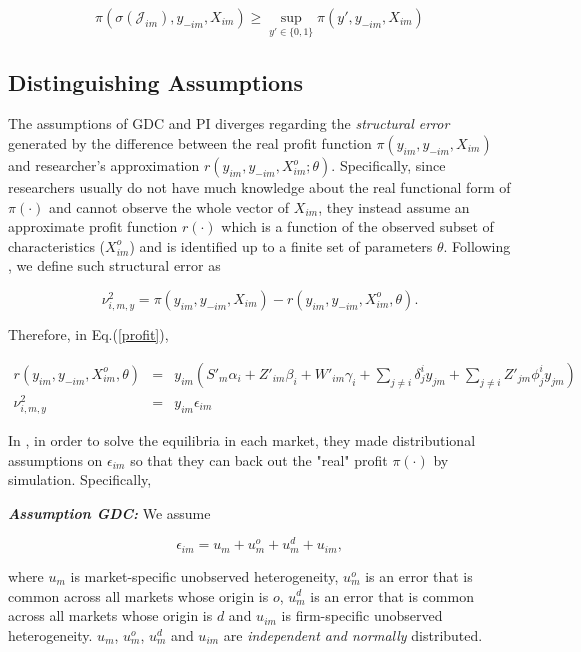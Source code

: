 \documentclass[a4paper]{article}
\begin{document}
\begin{equation}
\pi(\sigma(\mathcal{J}_{im}),y_{-im},X_{im}) \geq \sup_{y'\in \{0,1\}} \pi(y',y_{-im},X_{im})
\label{ie3}
\end{equation}

\subsection{Distinguishing Assumptions}

The assumptions of GDC and PI diverges regarding the \textit{structural error} generated by the difference between the real profit function $\pi(y_{im},y_{-im},X_{im})$ and researcher's approximation $r(y_{im},y_{-im},X^o_{im}; \theta)$. Specifically, since researchers usually do not have much knowledge about the real functional form of $\pi(\cdot)$ and cannot observe the whole vector of $X_{im}$, they instead assume an approximate profit function $r(\cdot)$ which is a function of the observed subset of characteristics ($X^o_{im}$) and is identified up to a finite set of parameters $\theta$. Following \cite{pakes2015moment}, we define such structural error as

\begin{equation}
\nu^2_{i,m,y}=\pi(y_{im},y_{-im},X_{im})-r(y_{im},y_{-im},X^o_{im},\theta).
\end{equation}

Therefore, in Eq.(\ref{profit}),

\begin{eqnarray}
r(y_{im},y_{-im},X^o_{im},\theta)&=&y_{im}(S'_m\alpha_i+Z'_{im}\beta_i+W'_{im}\gamma_i+\sum_{j\neq i}\delta_{j}^i y_{jm}+\sum_{j\neq i}Z'_{jm}\phi_j^iy_{jm})\\
\nu^2_{i,m,y}&=&y_{im}\epsilon_{im}
\end{eqnarray}


In \cite{ciliberto2009market}, in order to solve the equilibria in each market, they made distributional assumptions on $\epsilon_{im}$ so that they can back out the "real" profit $\pi(\cdot)$ by simulation. Specifically,

\bigskip
\textbf{\textit{Assumption GDC:}} We assume

$$\epsilon_{im}=u_{m}+u^o_{m}+u^d_{m}+u_{im},$$

where $u_m$ is market-specific unobserved heterogeneity, $u^o_m$ is an error that is common across all markets whose origin is $o$, $u^d_m$ is an error that is common across all markets whose origin is $d$ and $u_{im}$ is firm-specific unobserved heterogeneity. $u_m$, $u^o_m$, $u^d_m$ and $u_{im}$ are \textit{independent and normally} distributed.
\bigskip
\end{document}
